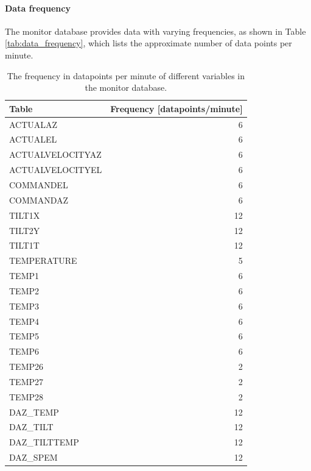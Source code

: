 \paragraph{Data frequency}
The monitor database provides data with varying frequencies, as shown in Table \ref{tab:data_frequency}, which lists the approximate number of data points per minute.

\begin{table}[H]
    \caption{The frequency in datapoints per minute of different variables in the monitor database.}
    \centering
    \begin{tabular}{lr}
        \toprule
        Table &  Frequency [datapoints/minute] \\
        \midrule
        ACTUALAZ &                    6 \\
        ACTUALEL &                    6 \\
        ACTUALVELOCITYAZ &                    6 \\
        ACTUALVELOCITYEL &                    6 \\
        COMMANDEL &                    6 \\
        COMMANDAZ &                    6 \\
        TILT1X &                   12 \\
        TILT2Y &                   12 \\
        TILT1T &                   12 \\
        TEMPERATURE &                    5 \\
        TEMP1 &                    6 \\
        TEMP2 &                    6 \\
        TEMP3 &                    6 \\
        TEMP4 &                    6 \\
        TEMP5 &                    6 \\
        TEMP6 &                    6 \\
        TEMP26 &                    2 \\
        TEMP27 &                    2 \\
        TEMP28 &                    2 \\
        DAZ\_TEMP &                   12 \\
        DAZ\_TILT &                   12 \\
        DAZ\_TILTTEMP &                   12 \\
        DAZ\_SPEM &                   12 \\

\end{tabular}
\end{table}
